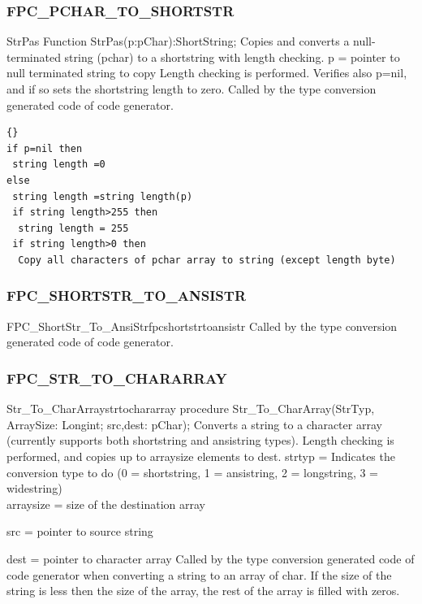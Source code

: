 \documentclass [12pt]{article}
\begin{document}
\subsubsection{FPC{\_}PCHAR{\_}TO{\_}SHORTSTR}
\label{subsubsec:mylabel44}

\begin{function}{StrPas}
\Declaration
Function StrPas(p:pChar):ShortString;
\Description 
Copies and converts a null-terminated string (pchar) to a shortstring with
length checking.
\Parameters 
p = pointer to null terminated string to copy 
\Notes 
Length checking is performed. Verifies also p=nil, and if so sets the
shortstring length to zero. Called by the type conversion generated code of
code generator.
\Algorithm
\begin{lstlisting}{}
if p=nil then
 string length =0 
else
 string length =string length(p) 
 if string length>255 then 
  string length = 255 
 if string length>0 then
  Copy all characters of pchar array to string (except length byte)
\end{lstlisting}
\end{function}

\subsubsection{FPC{\_}SHORTSTR{\_}TO{\_}ANSISTR}
\label{subsubsec:mylabel45}

\begin{functionl}{FPC{\_}ShortStr{\_}To{\_}AnsiStr}{fpcshortstrtoansistr}
\Notes 
Called by the type conversion generated code of code generator. 
\end{functionl}

\subsubsection{FPC{\_}STR{\_}TO{\_}CHARARRAY}
\label{subsubsec:mylabel46}

\begin{procedurel}{Str{\_}To{\_}CharArray}{strtochararray}
\Declaration
procedure Str{\_}To{\_}CharArray(StrTyp, ArraySize: Longint; src,dest: pChar);
\Description 
Converts a string to a character array (currently supports both shortstring and ansistring types). Length checking is performed, and copies up to \textsf{arraysize} elements to dest. 
\Parameters 
strtyp = Indicates the conversion type to do (0 = shortstring, 1 =
ansistring, 2 = longstring, 3 = widestring) \\ 
arraysize = size of the destination array \par 
src = pointer to source string \par 
dest = pointer to character array
\Notes 
Called by the type conversion generated code of code generator when
converting a string to an array of char. If the size of the string is less
then the size of the array, the rest of the array is filled with zeros.
\end{procedurel}
\end{document}
